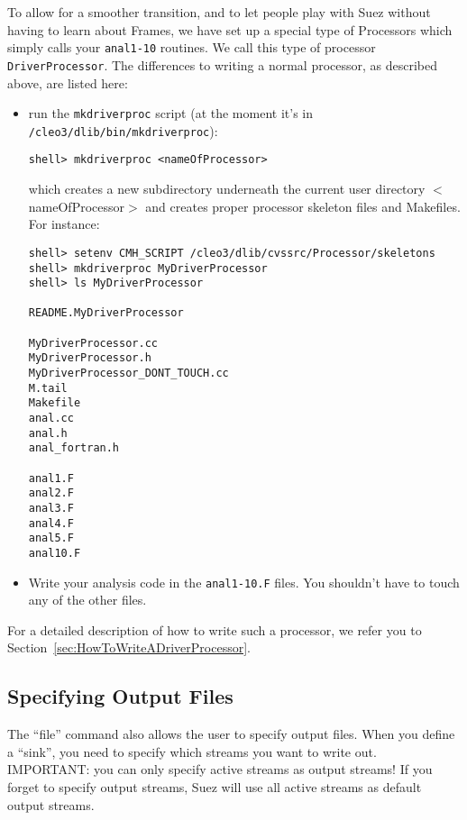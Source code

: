 \documentclass[12pt]{article}
\begin{document}
To allow for a smoother transition, and to let people play with Suez
without having to learn about Frames, we have set up a special type of
Processors which simply calls your \texttt{anal1-10} routines. We call
this type of processor \texttt{DriverProcessor}. 
The differences to writing a normal processor, as described above, are
listed here:

\begin{itemize}

\item run the \texttt{mkdriverproc} script (at the moment
it's in \texttt{/cleo3/dlib/bin/mkdriverproc}): 
%
\begin{verbatim}
shell> mkdriverproc <nameOfProcessor>
\end{verbatim}
%
which creates a new subdirectory underneath the current user directory
$<$nameOfProcessor$>$ and creates proper processor skeleton files and
Makefiles. 
\newline For instance:
%
\begin{verbatim}
shell> setenv CMH_SCRIPT /cleo3/dlib/cvssrc/Processor/skeletons
shell> mkdriverproc MyDriverProcessor
shell> ls MyDriverProcessor

README.MyDriverProcessor

MyDriverProcessor.cc
MyDriverProcessor.h
MyDriverProcessor_DONT_TOUCH.cc
M.tail
Makefile
anal.cc
anal.h
anal_fortran.h

anal1.F
anal2.F
anal3.F
anal4.F
anal5.F
anal10.F
\end{verbatim}

\item Write your analysis code in the \texttt{anal1-10.F} files. You
shouldn't have to touch any of the other files.

\end{itemize}

For a detailed description of how to write such a processor, we refer
you to Section~\ref{sec:HowToWriteADriverProcessor}.


\subsection{Specifying Output Files}
\label{sec:tutorial-fileoutput}

The ``file'' command also allows the user to specify output files.
When you define a ``sink'', you need to
specify which streams you want to write out. IMPORTANT: you can only
specify active streams as output streams!  If you forget to specify
output streams, Suez will use all active streams as default output
streams.
\end{document}
